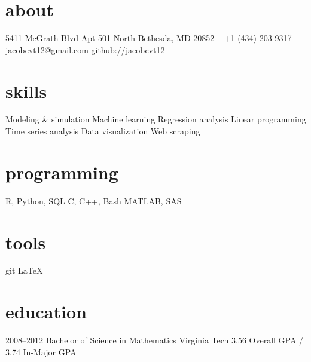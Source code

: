 \documentclass[]{friggeri-cv}
\begin{document}


\begin{aside} %
\section{about}
5411 McGrath Blvd
Apt 501
North Bethesda, MD 20852
~
+1 (434) 203 9317
~
\href{mailto:jacobcvt12@gmail.com}{jacobcvt12@gmail.com}
\href{https://github.com/jacobicvt12}{github://jacobcvt12}
\section{skills}
Modeling \& simulation
Machine learning
Regression analysis
Linear programming
Time series analysis
Data visualization
Web scraping
\section{programming}
R, Python, SQL
C, C++, Bash
MATLAB, SAS
\section{tools}
git
\LaTeX
\end{aside}


\section{education}

\begin{entrylist}
\entry
{2008--2012}
{Bachelor {\normalfont of Science in }Mathematics}
{Virginia Tech}
{3.56 Overall GPA / 3.74 In-Major GPA}
\end{entrylist}

\end{document}
